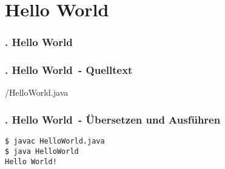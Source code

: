 \def\stitle{Hello World}
\section{\stitle}
\begin{frame}
  \frametitle{\kap. \stitle}%
\tableofcontents[current]
\end{frame}


\begin{frame}[fragile]%
  \frametitle{\kap. \stitle\ - Quelltext}%


{\getexercisefolder /HelloWorld.java}
\end{frame}


\begin{frame}[fragile]%
  \frametitle{\kap. \stitle\ - \"Ubersetzen und Ausf\"uhren}%

\begin{lstlisting}[title={Um das Programm HelloWorld auszuf\"uhren werden folgende Schritte auf dem Terminal durchgef\"uhrt.},style=BASH]
$ javac HelloWorld.java
$ java HelloWorld
Hello World!
\end{lstlisting}
\end{frame}
